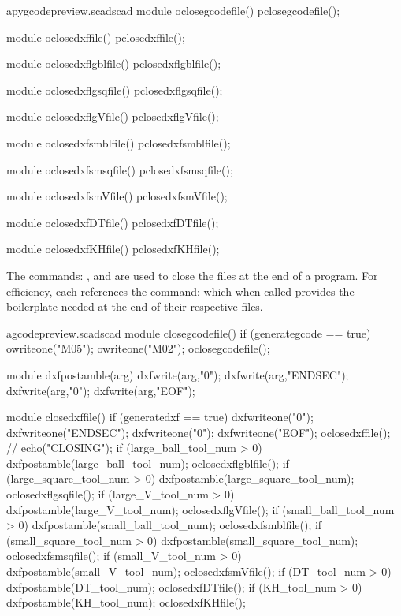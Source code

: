 \documentclass{ltxdoc}
\begin{document}
\lstset{firstnumber=\thepyscad}
\begin{writecode}{a}{pygcodepreview.scad}{scad}
module oclosegcodefile() {
    pclosegcodefile();
}

module oclosedxffile() {
    pclosedxffile();
}

module oclosedxflgblfile() {
    pclosedxflgblfile();
}

module oclosedxflgsqfile() {
    pclosedxflgsqfile();
}

module oclosedxflgVfile() {
    pclosedxflgVfile();
}

module oclosedxfsmblfile() {
    pclosedxfsmblfile();
}

module oclosedxfsmsqfile() {
    pclosedxfsmsqfile();
}

module oclosedxfsmVfile() {
    pclosedxfsmVfile();
}

module oclosedxfDTfile() {
    pclosedxfDTfile();
}

module oclosedxfKHfile() {
    pclosedxfKHfile();
}

\end{writecode}
\addtocounter{pyscad}{40}
%

The commands: , and  are used to close the files at the end of a program. For efficiency, each references the command:  which when called provides the boilerplate needed at the end of their respective files.

\lstset{firstnumber=\thegcpscad}
\begin{writecode}{a}{gcodepreview.scad}{scad}
module closegcodefile() {
  if (generategcode == true) {
    owriteone("M05");
    owriteone("M02");
    oclosegcodefile();
  }
}

module dxfpostamble(arg) {
    dxfwrite(arg,"0");
    dxfwrite(arg,"ENDSEC");
    dxfwrite(arg,"0");
    dxfwrite(arg,"EOF");
}

module closedxffile() {
  if (generatedxf == true) {
    dxfwriteone("0");
    dxfwriteone("ENDSEC");
    dxfwriteone("0");
    dxfwriteone("EOF");
    oclosedxffile();
//    echo("CLOSING");
    if (large_ball_tool_num >  0) {    dxfpostamble(large_ball_tool_num);
      oclosedxflgblfile();
    } 
    if (large_square_tool_num >  0) {    dxfpostamble(large_square_tool_num);
      oclosedxflgsqfile();
    } 
    if (large_V_tool_num >  0) {    dxfpostamble(large_V_tool_num);
      oclosedxflgVfile();
    } 
    if (small_ball_tool_num >  0) {    dxfpostamble(small_ball_tool_num);
      oclosedxfsmblfile();
    } 
    if (small_square_tool_num >  0) {    dxfpostamble(small_square_tool_num);
      oclosedxfsmsqfile();
    } 
    if (small_V_tool_num >  0) {    dxfpostamble(small_V_tool_num);
      oclosedxfsmVfile();
    } 
    if (DT_tool_num >  0) {    dxfpostamble(DT_tool_num);
      oclosedxfDTfile();
    } 
    if (KH_tool_num >  0) {    dxfpostamble(KH_tool_num);
      oclosedxfKHfile();
    } 
  }
}

\end{writecode}
\addtocounter{gcpscad}{50}
\end{document}
